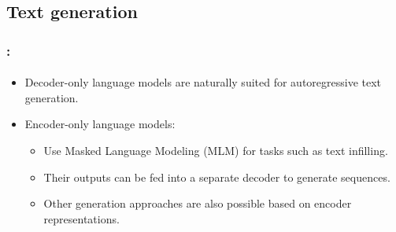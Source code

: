 \documentclass[xcolor=table]{beamer}
\begin{document}
\subsection{Text generation}

\begin{frame}
	\frametitle{\insertshortsubtitle: \insertsection}
	\framesubtitle{\insertsubsection}
	
	\begin{itemize}
		\item Decoder-only language models are naturally suited for autoregressive text generation.
		\item Encoder-only language models:
		\begin{itemize}
			\item Use Masked Language Modeling (MLM) for tasks such as text infilling.
			\item Their outputs can be fed into a separate decoder to generate sequences.
			\item Other generation approaches are also possible based on encoder representations.
		\end{itemize}
	\end{itemize}
	
	
\end{frame}



	
\end{document}
